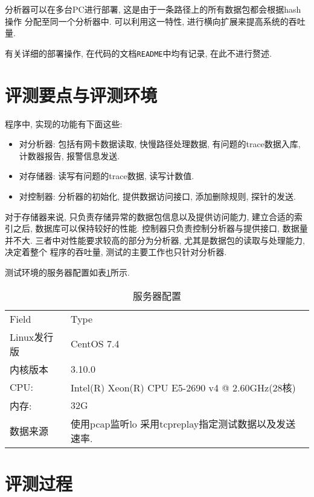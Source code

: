   分析器可以在多台PC进行部署, 这是由于一条路径上的所有数据包都会根据hash操作
分配至同一个分析器中. 可以利用这一特性, 进行横向扩展来提高系统的吞吐量.

  有关详细的部署操作, 在代码的文档\texttt{README}\cite{Niftyflow}中均有记录,
在此不进行赘述.

\section{评测要点与评测环境}

  程序中, 实现的功能有下面这些:

\begin{itemize}
    \item 对分析器: 包括有网卡数据读取, 快慢路径处理数据, 有问题的trace数据入库,
计数器报告, 报警信息发送.
    \item 对存储器: 读写有问题的trace数据, 读写计数值.
    \item 对控制器: 分析器的初始化, 提供数据访问接口, 添加删除规则, 探针的发送.
\end{itemize}

  对于存储器来说, 只负责存储异常的数据包信息以及提供访问能力, 建立合适的索引之后,
数据库可以保持较好的性能. 控制器只负责控制分析器与提供接口, 数据量并不大.
三者中对性能要求较高的部分为分析器, 尤其是数据包的读取与处理能力, 决定着整个
程序的吞吐量, 测试的主要工作也只针对分析器.


测试环境的服务器配置如表\ref{tbl:server_config}所示.

\begin{table}[]
    \centering
    \caption{服务器配置}
    \label{tbl:server_config}
    \begin{tabular}{ll} \hline
    Field    & Type          \\
    Linux发行版 & CentOS 7.4 \\
    内核版本   &   3.10.0 \\
    CPU:     & Intel(R) Xeon(R) CPU E5-2690 v4 @ 2.60GHz(28核) \\
    内存:    & 32G                                       \\
    数据来源 & 使用pcap监听lo 采用tcpreplay指定测试数据以及发送速率. \\ \hline
    \end{tabular}
\end{table}


\section{评测过程}

